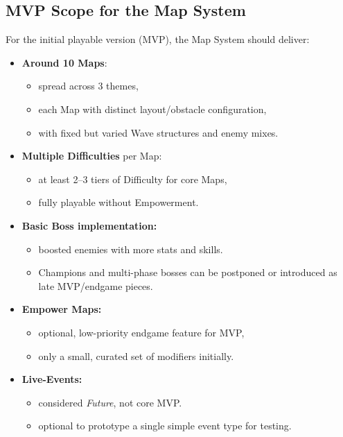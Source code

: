 
\subsection{MVP Scope for the Map System}

For the initial playable version (MVP), the Map System should deliver:

\begin{itemize}
	\item \textbf{Around 10 Maps}:
	\begin{itemize}
		\item spread across 3 themes,
		\item each Map with distinct layout/obstacle configuration,
		\item with fixed but varied Wave structures and enemy mixes.
	\end{itemize}
	\item \textbf{Multiple Difficulties} per Map:
	\begin{itemize}
		\item at least 2--3 tiers of Difficulty for core Maps,
		\item fully playable without Empowerment.
	\end{itemize}
	\item \textbf{Basic Boss implementation:}
	\begin{itemize}
		\item boosted enemies with more stats and skills.
		\item Champions and multi-phase bosses can be postponed or introduced as late MVP/endgame pieces.
	\end{itemize}
	\item \textbf{Empower Maps:}
	\begin{itemize}
		\item optional, low-priority endgame feature for MVP,
		\item only a small, curated set of modifiers initially.
	\end{itemize}
	\item \textbf{Live-Events:}
	\begin{itemize}
		\item considered \emph{Future}, not core MVP.
		\item optional to prototype a single simple event type for testing.
	\end{itemize}
\end{itemize}

